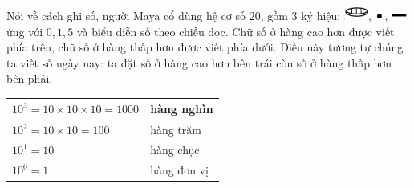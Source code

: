 \begin{multicols}{2}
	\vskip 0.1cm
	Nói về cách ghi số,  người Maya  cổ dùng hệ cơ số $20$, gồm $3$ ký hiệu:  \includegraphics[scale=0.7]{29},  \includegraphics[scale=0.7]{30}, \includegraphics[scale=0.7]{31}  ứng với $0,1, 5$ và biểu diễn số theo chiều dọc. Chữ số ở hàng cao hơn được viết phía trên, chữ số ở hàng thấp hơn được viết phía dưới. Điều này tương tự chúng ta viết số ngày nay: ta đặt số ở hàng cao hơn bên trái còn số ở hàng thấp hơn bên phải. 
	\begin{table}[H]
		\vspace*{-5pt}
		\centering
		\setlength{\tabcolsep}{4.5pt}
		\renewcommand{\arraystretch}{1.25}
		\begin{tabular}{|l|l|}
			\hline
			$10^3 = 10\!\times\! 10 \!\times\! 10 =1000$& hàng nghìn\\
			\hline
			$10^2 = 10\!\times\! 10 =100$& hàng trăm\\
			\hline
			$10^1 = 10$& hàng chục\\
			\hline
			$10^0 = 1$& hàng đơn vị\\
			\hline
		\end{tabular}
	\end{table}

\end{multicols}
